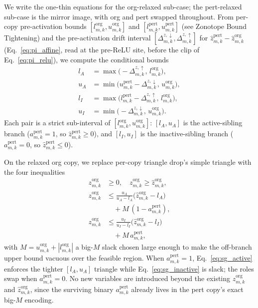 \documentclass[11pt]{article}
\begin{document}
We write the one-thin equations for the org-relaxed sub-case; the pert-relaxed sub-case is the mirror image, with org and pert swapped throughout. From per-copy pre-activation bounds $[l^{\mathrm{org}}_{m,k}, u^{\mathrm{org}}_{m,k}]$ and $[l^{\mathrm{pert}}_{m,k}, u^{\mathrm{pert}}_{m,k}]$ (see Zonotope Bound Tightening) and the pre-activation drift interval $[\Delta^{z,\downarrow}_{m,k}, \Delta^{z,\uparrow}_{m,k}]$ for $\hat z^{\mathrm{pert}}_{m,k} - \hat z^{\mathrm{org}}_{m,k}$ (Eq.~\eqref{eq:pi_affine}, read at the pre-ReLU site, before the clip of Eq.~\eqref{eq:pi_relu}), we compute the conditional bounds
\begin{align}
  l_A &= \max\!\bigl(-\Delta^{z,\uparrow}_{m,k},\, l^{\mathrm{org}}_{m,k}\bigr), \\
  u_A &= \min\!\bigl(u^{\mathrm{pert}}_{m,k} - \Delta^{z,\downarrow}_{m,k},\, u^{\mathrm{org}}_{m,k}\bigr),
  \label{eq:sg_lAuA}\\
  l_I &= \max\!\bigl(l^{\mathrm{pert}}_{m,k} - \Delta^{z,\uparrow}_{m,k},\, l^{\mathrm{org}}_{m,k}\bigr), \\
  u_I &= \min\!\bigl(-\Delta^{z,\downarrow}_{m,k},\, u^{\mathrm{org}}_{m,k}\bigr).
  \label{eq:sg_lIuI}
\end{align}
Each pair is a strict sub-interval of $[l^{\mathrm{org}}_{m,k}, u^{\mathrm{org}}_{m,k}]$: $[l_A, u_A]$ is the active-sibling branch ($a^{\mathrm{pert}}_{m,k} = 1$, so $\hat z^{\mathrm{pert}}_{m,k} \ge 0$), and $[l_I, u_I]$ is the inactive-sibling branch ($a^{\mathrm{pert}}_{m,k} = 0$, so $\hat z^{\mathrm{pert}}_{m,k} \le 0$).

On the relaxed org copy, we replace per-copy triangle drop's simple triangle with the four inequalities
\begin{align}
  z^{\mathrm{org}}_{m,k} &\ge 0, \quad z^{\mathrm{org}}_{m,k} \ge \hat z^{\mathrm{org}}_{m,k},
  \label{eq:sg_lower}\\
  z^{\mathrm{org}}_{m,k} &\le \tfrac{u_A}{u_A - l_A}\bigl(\hat z^{\mathrm{org}}_{m,k} - l_A\bigr) \nonumber\\
    &\quad + M\,(1 - a^{\mathrm{pert}}_{m,k}),
  \label{eq:sg_active}\\
  z^{\mathrm{org}}_{m,k} &\le \tfrac{u_I}{u_I - l_I}\bigl(\hat z^{\mathrm{org}}_{m,k} - l_I\bigr) \nonumber\\
    &\quad + M\,a^{\mathrm{pert}}_{m,k},
  \label{eq:sg_inactive}
\end{align}
with $M = u^{\mathrm{org}}_{m,k} + |l^{\mathrm{org}}_{m,k}|$ a big-$M$ slack chosen large enough to make the off-branch upper bound vacuous over the feasible region. When $a^{\mathrm{pert}}_{m,k} = 1$, Eq.~\eqref{eq:sg_active} enforces the tighter $[l_A, u_A]$ triangle while Eq.~\eqref{eq:sg_inactive} is slack; the roles swap when $a^{\mathrm{pert}}_{m,k} = 0$. No new variables are introduced beyond the existing $z^{\mathrm{org}}_{m,k}$ and $\hat z^{\mathrm{org}}_{m,k}$, since the surviving binary $a^{\mathrm{pert}}_{m,k}$ already lives in the pert copy's exact big-$M$ encoding.
\end{document}
